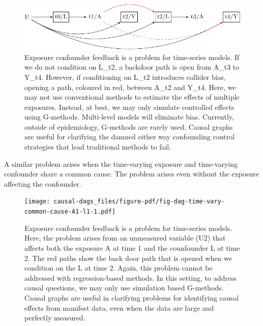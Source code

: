 \documentclass[
  singlecolumn]{report}
\begin{document}
\begin{figure}

{\centering \includegraphics[width=1\textwidth,height=\textheight]{causal-dags_files/figure-pdf/fig-dag-9-1.pdf}

}

\caption{\label{fig-dag-9}Exposure confounder feedback is a problem for
time-series models. If we do not condition on L\_t2, a backdoor path is
open from A\_t3 to Y\_t4. However, if conditioning on L\_t2 introduces
collider bias, opening a path, coloured in red, between A\_t2 and Y\_t4.
Here, we may not use conventional methods to estimate the effects of
multiple exposures. Instead, at best, we may only simulate controlled
effects using G-methods. Multi-level models will eliminate bias.
Currently, outside of epidemiology, G-methods are rarely used. Causal
graphs are useful for clarifying the damned either way confounding
control strategies that lead traditional methods to fail.}

\end{figure}

A similar problem arises when the time-varying exposure and time-varying
confounder share a common cause. The problem arises even without the
exposure affecting the confounder.

\begin{figure}

{\centering \texttt{[image: causal-dags\_files/figure-pdf/fig-dag-time-vary-common-cause-A1-l1-1.pdf]}

}

\caption{\label{fig-dag-time-vary-common-cause-A1-l1}Exposure confounder
feedback is a problem for time-series models. Here, the problem arises
from an unmeasured variable (U2) that affects both the exposure A at
time 1 and the counfounder L at time 2. The red paths show the back door
path that is opened when we condition on the L at time 2. Again, this
problem cannot be addressed with regression-based methods. In this
setting, to address causal questions, we may only use simulation based
G-methods. Causal graphs are useful in clarifying problems for
identifying causal effects from manifest data, even when the data are
large and perfectly measured.}

\end{figure}
\end{document}
